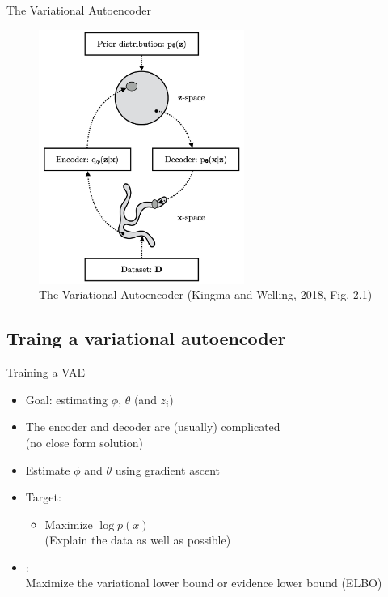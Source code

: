\documentclass[10pt]{beamer}
\begin{document}
\begin{frame}{The Variational Autoencoder}

\begin{figure}[h]
\centering
\includegraphics[width=0.6\textwidth]{fig/Kingma_Welling_2018_Fig_2_1.png}
\caption{The Variational Autoencoder (Kingma and Welling, 2018, Fig. 2.1)}
\end{figure}
\end{frame}

\subsection{Traing a variational autoencoder}

\begin{frame}{Training a VAE}
\begin{itemize}
\item {\color{uured} Goal}: estimating $\phi$, $\theta$ (and $z_i$)
\pause
\item The encoder and decoder are (usually) complicated \\ (no close form solution)
\item Estimate $\phi$ and $\theta$ using gradient ascent
\pause
\item Target:
\begin{itemize}
\item Maximize $\log p(x)$\\(Explain the data as well as possible)
\end{itemize}\pause
\item {}: \\Maximize the variational lower bound or {\color{uured} evidence lower bound (ELBO)}
\end{itemize}
\end{frame}
\end{document}
